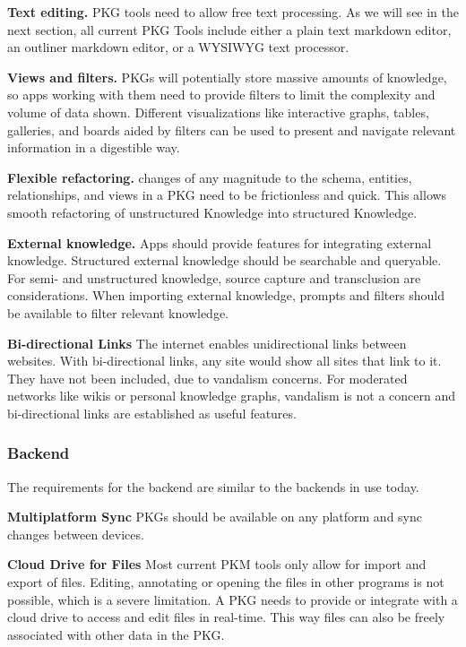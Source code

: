 \textbf{Text editing.} PKG tools need to allow free text processing. As we will see in the next section, all current PKG Tools include either a plain text markdown editor, an outliner markdown editor, or a WYSIWYG text processor.

\textbf{Views and filters.} PKGs will potentially store massive amounts of knowledge, so apps working with them need to provide filters to limit the complexity and volume of data shown. Different visualizations like interactive graphs, tables, galleries, and boards aided by filters can be used to present and navigate relevant information in a digestible way.

\textbf{Flexible refactoring.} changes of any magnitude to the schema, entities, relationships, and views in a PKG need to be frictionless and quick. This allows smooth refactoring of unstructured Knowledge into structured Knowledge.

\textbf{External knowledge.} Apps should provide features for integrating external knowledge. Structured external knowledge should be searchable and queryable. For semi- and unstructured knowledge, source capture and transclusion are considerations. When importing external knowledge, prompts and filters should be available to filter relevant knowledge.
    
\textbf{Bi-directional Links} The internet enables unidirectional links between websites. With bi-directional links, any site would show all sites that link to it. They have not been included, due to vandalism concerns. For moderated networks like wikis or personal knowledge graphs, vandalism is not a concern and bi-directional links are established as useful features.

\subsubsection*{Backend}
The requirements for the backend are similar to the backends in use today.

\textbf{Multiplatform Sync} PKGs should be available on any platform and sync changes between devices.

\textbf{Cloud Drive for Files} Most current PKM tools only allow for import and export of files. Editing, annotating or opening the files in other programs is not possible, which is a severe limitation. A PKG needs to provide or integrate with a cloud drive to access and edit files in real-time. This way files can also be freely associated with other data in the PKG.


